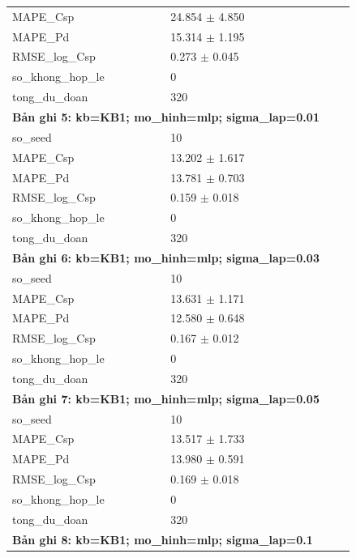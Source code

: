 \begin{longtable}{p{0.43\linewidth}p{0.50\linewidth}}
MAPE\_\allowbreak Csp & 24.854 $\pm$ 4.850 \\
MAPE\_\allowbreak Pd & 15.314 $\pm$ 1.195 \\
RMSE\_\allowbreak log\_\allowbreak Csp & 0.273 $\pm$ 0.045 \\
so\_\allowbreak khong\_\allowbreak hop\_\allowbreak le & 0 \\
tong\_\allowbreak du\_\allowbreak doan & 320 \\
\midrule
\multicolumn{2}{p{0.95\linewidth}}{\textbf{Bản ghi 5: kb=KB1; mo\_hinh=mlp; sigma\_lap=0.01}} \\
so\_\allowbreak seed & 10 \\
MAPE\_\allowbreak Csp & 13.202 $\pm$ 1.617 \\
MAPE\_\allowbreak Pd & 13.781 $\pm$ 0.703 \\
RMSE\_\allowbreak log\_\allowbreak Csp & 0.159 $\pm$ 0.018 \\
so\_\allowbreak khong\_\allowbreak hop\_\allowbreak le & 0 \\
tong\_\allowbreak du\_\allowbreak doan & 320 \\
\midrule
\multicolumn{2}{p{0.95\linewidth}}{\textbf{Bản ghi 6: kb=KB1; mo\_hinh=mlp; sigma\_lap=0.03}} \\
so\_\allowbreak seed & 10 \\
MAPE\_\allowbreak Csp & 13.631 $\pm$ 1.171 \\
MAPE\_\allowbreak Pd & 12.580 $\pm$ 0.648 \\
RMSE\_\allowbreak log\_\allowbreak Csp & 0.167 $\pm$ 0.012 \\
so\_\allowbreak khong\_\allowbreak hop\_\allowbreak le & 0 \\
tong\_\allowbreak du\_\allowbreak doan & 320 \\
\midrule
\multicolumn{2}{p{0.95\linewidth}}{\textbf{Bản ghi 7: kb=KB1; mo\_hinh=mlp; sigma\_lap=0.05}} \\
so\_\allowbreak seed & 10 \\
MAPE\_\allowbreak Csp & 13.517 $\pm$ 1.733 \\
MAPE\_\allowbreak Pd & 13.980 $\pm$ 0.591 \\
RMSE\_\allowbreak log\_\allowbreak Csp & 0.169 $\pm$ 0.018 \\
so\_\allowbreak khong\_\allowbreak hop\_\allowbreak le & 0 \\
tong\_\allowbreak du\_\allowbreak doan & 320 \\
\midrule
\multicolumn{2}{p{0.95\linewidth}}{\textbf{Bản ghi 8: kb=KB1; mo\_hinh=mlp; sigma\_lap=0.1}} \\

\end{longtable}
